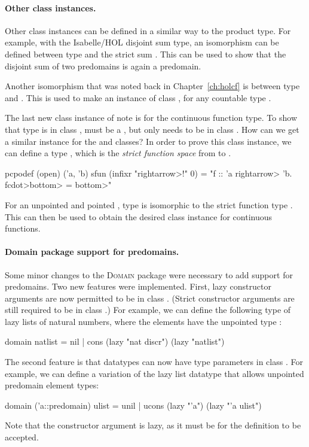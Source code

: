 \paragraph{Other class instances.} Other  class instances can be defined in a similar way to the product type. For example, with the Isabelle/HOL disjoint sum type, an isomorphism can be defined between type  and the strict sum . This can be used to show that the disjoint sum of two predomains is again a predomain.

Another isomorphism that was noted back in Chapter~\ref{ch:holcf} is between type  and . This is used to make  an instance of class , for any countable type .

The last new class instance of note is for the continuous function type. To show that type  is in class ,  must be a , but  only needs to be in class . How can we get a similar instance for the   and  classes? In order to prove this class instance, we can define a type , which is the \emph{strict function space} from  to .
%
\begin{isacode}
pcpodef (open) ('a, 'b) sfun (infixr "\<rightarrow>!" 0) = "{f :: 'a \<rightarrow> 'b. f\<cdot>\<bottom> = \<bottom>}"
\end{isacode}
%
For an unpointed  and pointed , type  is isomorphic to the strict function type . This can then be used to obtain the desired class instance for continuous functions.

\paragraph{Domain package support for predomains.} Some minor changes to the \textsc{Domain} package were necessary to add support for predomains. Two new features were implemented. First, lazy constructor arguments are now permitted to be in class . (Strict constructor arguments are still required to be in class .) For example, we can define the following type of lazy lists of natural numbers, where the elements have the unpointed type :
%
\begin{isacode}
domain natlist = nil | cons (lazy "nat discr") (lazy "natlist")
\end{isacode}
%
The second feature is that datatypes can now have type parameters in class . For example, we can define a variation of the lazy list datatype that allows unpointed predomain element types:
%
\begin{isacode}
domain ('a::predomain) ulist = unil | ucons (lazy "'a") (lazy "'a ulist")
\end{isacode}
%
Note that the constructor argument  is lazy, as it must be for the definition to be accepted.

